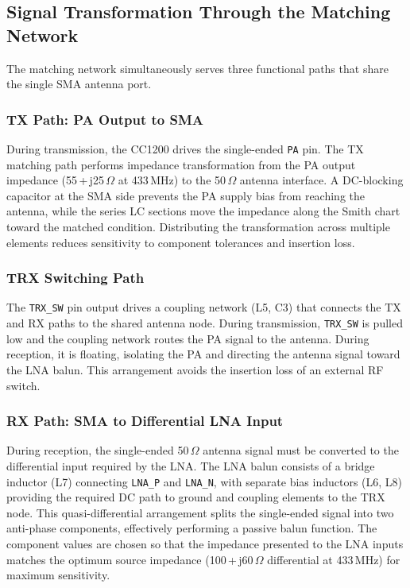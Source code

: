 \subsection{Signal Transformation Through the Matching Network}

The matching network simultaneously serves three functional paths that share the single SMA antenna port.

\subsubsection{TX Path: PA Output to SMA}

During transmission, the CC1200 drives the single-ended \texttt{PA} pin. The TX matching path performs impedance transformation from the PA output impedance (55\,+\,j25\,$\Omega$ at 433\,MHz) to the 50\,$\Omega$ antenna interface. A DC-blocking capacitor at the SMA side prevents the PA supply bias from reaching the antenna, while the series LC sections move the impedance along the Smith chart toward the matched condition. Distributing the transformation across multiple elements reduces sensitivity to component tolerances and insertion loss.

\subsubsection{TRX Switching Path}

The \texttt{TRX\_SW} pin output drives a coupling network (L5, C3) that connects the TX and RX paths to the shared antenna node. During transmission, \texttt{TRX\_SW} is pulled low and the coupling network routes the PA signal to the antenna. During reception, it is floating, isolating the PA and directing the antenna signal toward the LNA balun. This arrangement avoids the insertion loss of an external RF switch.

\subsubsection{RX Path: SMA to Differential LNA Input}

During reception, the single-ended 50\,$\Omega$ antenna signal must be converted to the differential input required by the LNA. The LNA balun consists of a bridge inductor (L7) connecting \texttt{LNA\_P} and \texttt{LNA\_N}, with separate bias inductors (L6, L8) providing the required DC path to ground and coupling elements to the TRX node. This quasi-differential arrangement splits the single-ended signal into two anti-phase components, effectively performing a passive balun function. The component values are chosen so that the impedance presented to the LNA inputs matches the optimum source impedance (100\,+\,j60\,$\Omega$ differential at 433\,MHz) for maximum sensitivity.

